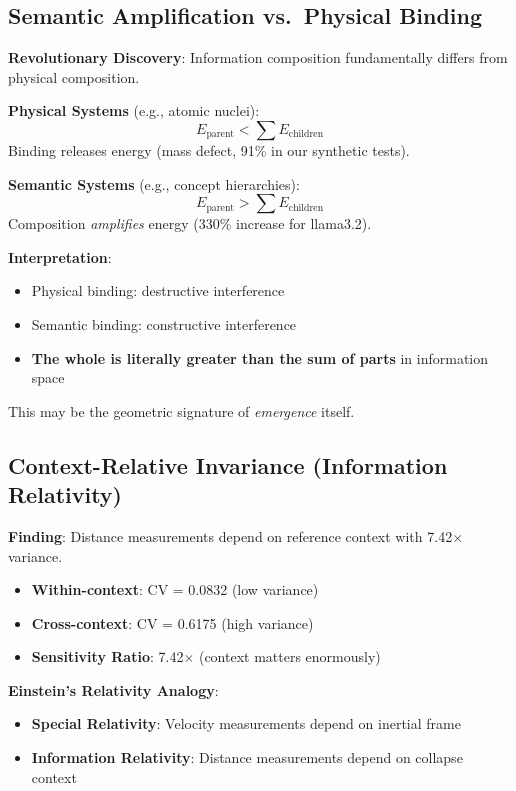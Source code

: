 \documentclass[11pt,a4paper]{article}
\begin{document}
\subsection{Semantic Amplification vs.\ Physical Binding}

\textbf{Revolutionary Discovery}: Information composition fundamentally differs from physical composition.

\textbf{Physical Systems} (e.g., atomic nuclei):
\begin{equation}
E_{\text{parent}} < \sum E_{\text{children}}
\end{equation}
Binding releases energy (mass defect, 91\% in our synthetic tests).

\textbf{Semantic Systems} (e.g., concept hierarchies):
\begin{equation}
E_{\text{parent}} > \sum E_{\text{children}}
\end{equation}
Composition \emph{amplifies} energy (330\% increase for llama3.2).

\textbf{Interpretation}: 
\begin{itemize}
    \item Physical binding: destructive interference
    \item Semantic binding: constructive interference
    \item \textbf{The whole is literally greater than the sum of parts} in information space
\end{itemize}

This may be the geometric signature of \emph{emergence} itself.

\subsection{Context-Relative Invariance (Information Relativity)}

\textbf{Finding}: Distance measurements depend on reference context with 7.42$\times$ variance.

\begin{itemize}
    \item \textbf{Within-context}: CV = 0.0832 (low variance)
    \item \textbf{Cross-context}: CV = 0.6175 (high variance)
    \item \textbf{Sensitivity Ratio}: 7.42$\times$ (context matters enormously)
\end{itemize}

\textbf{Einstein's Relativity Analogy}:
\begin{itemize}
    \item \textbf{Special Relativity}: Velocity measurements depend on inertial frame
    \item \textbf{Information Relativity}: Distance measurements depend on collapse context
\end{itemize}
\end{document}
